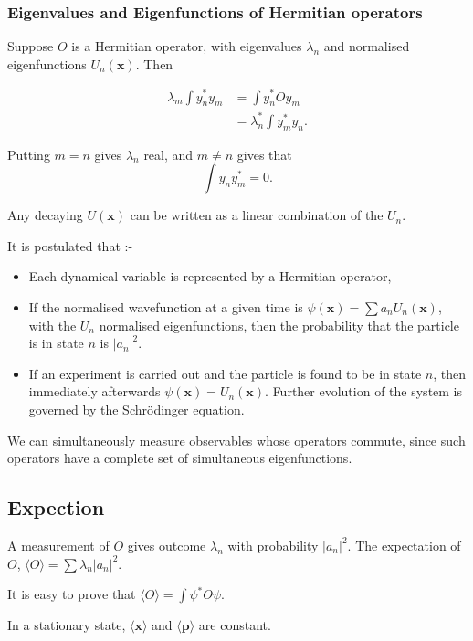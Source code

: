 \documentclass[a4paper]{article}
\newcommand{\schrod}{Schr{\"o}dinger }
\newcommand{\abs}[1]{\left| #1 \right|}
\newcommand{\mom}{\mathbf{p}}
\newcommand{\posn}{\mathbf{x}}
\begin{document}
\subsubsection{Eigenvalues and Eigenfunctions of Hermitian operators}

Suppose $O$ is a Hermitian operator, with eigenvalues $\lambda_n$ and
normalised eigenfunctions $U_n(\posn)$.  Then

\begin{align*}
\lambda_m \int y_n^* y_m &= \int y_n^* O y_m \\
&= \lambda_n^* \int y_m^* y_n.
\end{align*}

Putting $m=n$ gives $\lambda_n$ real, and $m \ne n$ gives that
\[
\int y_n y_m^* = 0.
\]

Any decaying $U(\posn)$ can be written as a linear combination of the $U_n$.

It is postulated that :-

\begin{itemize}
\item Each dynamical variable is represented by a Hermitian operator,
\item If the normalised wavefunction at a given time is
$\psi(\posn) = \sum a_n U_n(\posn)$, with the $U_n$ normalised eigenfunctions,
then the probability that the particle is in state $n$ is $\abs{a_n}^2$.
\item If an experiment is carried out and the particle is found to be in
state $n$, then immediately afterwards $\psi(\posn) = U_n(\posn)$.  Further
evolution of the system is governed by the \schrod equation.
\end{itemize}

We can simultaneously measure observables whose operators commute, since
such operators have a complete set of simultaneous eigenfunctions.

\subsection{Expection}

A measurement of $O$ gives outcome $\lambda_n$ with probability $\abs{a_n}^2$.
The expectation of $O$, $\langle O \rangle = \sum \lambda_n \abs{a_n}^2$.

It is easy to prove that $\langle O \rangle = \int \psi^* O\psi$.

In a stationary state, $\langle \posn \rangle$ and $\langle \mom \rangle$ are
constant.  
\end{document}
